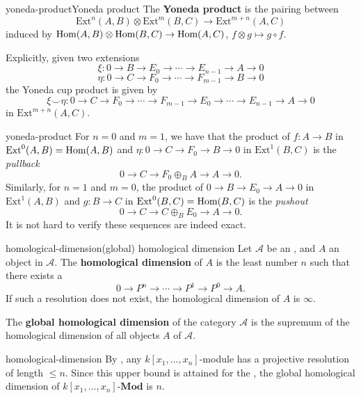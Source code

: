 \begin{topic}{yoneda-product}{Yoneda product}
    The \textbf{Yoneda product} is the pairing between 
    \[ \text{Ext}^n(A, B) \otimes \text{Ext}^m(B, C) \to \text{Ext}^{m + n}(A, C) \]
    induced by $\text{Hom}(A, B) \otimes \text{Hom}(B, C) \to \text{Hom}(A, C)$, $f \otimes g \mapsto g \circ f$.
    
    Explicitly, given two extensions
    \[ \xi : 0 \to B \to E_0 \to \cdots \to E_{n - 1} \to A \to 0 \]
    \[ \eta : 0 \to C \to F_0 \to \cdots \to F_{m - 1} \to B \to 0 \]
    the Yoneda cup product is given by
    \[ \xi \smile \eta : 0 \to C \to F_0 \to \cdots \to F_{m - 1} \to E_0 \to \cdots \to E_{n - 1} \to A \to 0 \]
    in $\text{Ext}^{m + n}(A, C)$.
\end{topic}

\begin{example}{yoneda-product}
    For $n = 0$ and $m = 1$, we have that the product of $f : A \to B$ in $\text{Ext}^0(A, B) = \text{Hom}(A, B)$ and $\eta : 0 \to C \to F_0 \to B \to 0$ in $\text{Ext}^1(B, C)$ is the \textit{pullback}
    \[ 0 \to C \to F_0 \oplus_B A \to A \to 0 . \]
    Similarly, for $n = 1$ and $m = 0$, the product of $0 \to B \to E_0 \to A \to 0$ in $\text{Ext}^1(A, B)$ and $g : B \to C$ in $\text{Ext}^0(B, C) = \text{Hom}(B, C)$ is the \textit{pushout}
    \[ 0 \to C \to C \oplus_B E_0 \to A \to 0 . \]
    It is not hard to verify these sequences are indeed exact. 
\end{example}

\begin{topic}{homological-dimension}{(global) homological dimension}
    Let $\mathcal{A}$ be an , and $A$ an object in $\mathcal{A}$. The \textbf{homological dimension} of $A$ is the least number $n$ such that there exists a 
    \[ 0 \to P^n \to \cdots \to P^1 \to P^0 \to A . \]
    If such a resolution does not exist, the homological dimension of $A$ is $\infty$.
    
    The \textbf{global homological dimension} of the category $\mathcal{A}$ is the supremum of the homological dimension of all objects $A$ of $\mathcal{A}$.
\end{topic}

\begin{example}{homological-dimension}
    By , any $k[x_1, \ldots, x_n]$-module has a projective resolution of length $\le n$. Since this upper bound is attained for the , the global homological dimension of $k[x_1, \ldots, x_n]\text{-}\textbf{Mod}$ is $n$.
\end{example}

